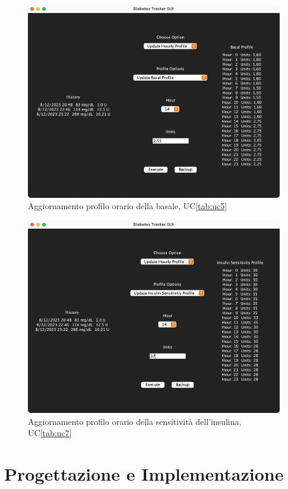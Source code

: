 \documentclass[twocolumn]{article}
\begin{document}
\begin{figure}
    \centering
    \includegraphics[width=14cm]{gui-basal.png}
    \caption{Aggiornamento profilo orario della basale, UC\ref{tab:uc5}}
    \label{fig:gui-basal}
\end{figure}

\begin{figure}[!htbp]
    \centering
    \includegraphics[width=14cm]{gui-insens.png}
    \caption{Aggiornamento profilo orario della sensitività dell'insulina, UC\ref{tab:uc7}}
    \label{fig:gui-insens}
\end{figure}


\section{Progettazione e Implementazione} 
\end{document}
